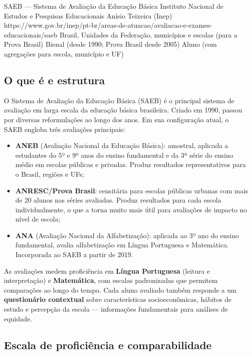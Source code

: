 \ficharapida
  {SAEB — Sistema de Avaliação da Educação Básica}
  {Instituto Nacional de Estudos e Pesquisas Educacionais Anísio Teixeira (Inep)}
  {https://www.gov.br/inep/pt-br/areas-de-atuacao/avaliacao-e-exames-educacionais/saeb}
  {Brasil, Unidades da Federação, municípios e escolas (para a Prova Brasil)}
  {Bienal (desde 1990; Prova Brasil desde 2005)}
  {Aluno (com agregações para escola, município e UF)}

\subsection{O que é e estrutura}

O Sistema de Avaliação da Educação Básica (SAEB) é o principal sistema de avaliação em larga escala da educação básica brasileira. Criado em 1990, passou por diversas reformulações ao longo dos anos. Em sua configuração atual, o SAEB engloba três avaliações principais:

\begin{itemize}
  \item \textbf{ANEB} (Avaliação Nacional da Educação Básica): amostral, aplicada a estudantes do 5º e 9º anos do ensino fundamental e da 3ª série do ensino médio em escolas públicas e privadas. Produz resultados representativos para o Brasil, regiões e UFs;

  \item \textbf{ANRESC/Prova Brasil}: censitária para escolas públicas urbanas com mais de 20 alunos nas séries avaliadas. Produz resultados para cada escola individualmente, o que a torna muito mais útil para avaliações de impacto no nível de escola;

  \item \textbf{ANA} (Avaliação Nacional da Alfabetização): aplicada ao 3º ano do ensino fundamental, avalia alfabetização em Língua Portuguesa e Matemática. Incorporada ao SAEB a partir de 2019.
\end{itemize}

As avaliações medem proficiência em \textbf{Língua Portuguesa} (leitura e interpretação) e \textbf{Matemática}, com escalas padronizadas que permitem comparações ao longo do tempo. Cada aluno avaliado também responde a um \textbf{questionário contextual} sobre características socioeconômicas, hábitos de estudo e percepção da escola — informações fundamentais para análises de equidade.

\subsection{Escala de proficiência e comparabilidade}

